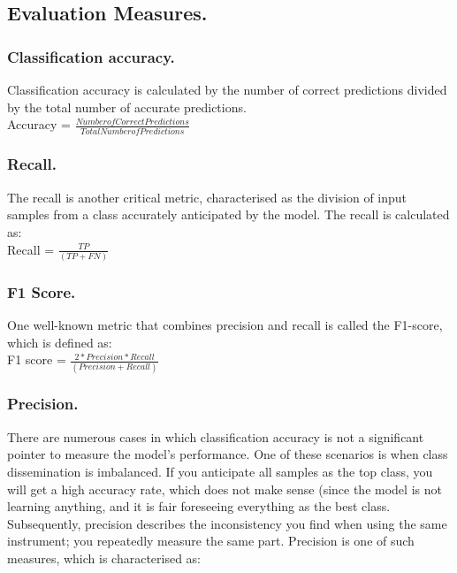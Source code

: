 \documentclass[11pt]{report}
\begin{document}
\subsection{Evaluation Measures.}
\subsubsection*{Classification accuracy.}
Classification accuracy is calculated by the number of correct predictions divided by
the total number of accurate predictions.\\

Accuracy = $\frac{Number of Correct Predictions}{Total Number of Predictions}$



\subsubsection*{Recall.}
The recall is another critical metric, characterised as the division of input samples
from a class accurately anticipated by the model. The recall is calculated as:\\

Recall = $\frac{TP}{(TP + FN)}$

\subsubsection*{F1 Score.}
One well-known metric that combines precision and recall is called the F1-score, which
is defined as:\\

F1 score = $\frac{2 * Precision * Recall}{(Precision + Recall)}$

\subsubsection*{Precision.}
There are numerous cases in which classification accuracy is not a significant pointer
to measure the model’s performance. One of these scenarios is when class dissemination
is imbalanced. If you anticipate all samples as the top class, you will get a high accuracy
rate, which does not make sense (since the model is not learning anything, and it is fair
foreseeing everything as the best class. Subsequently, precision describes the inconsistency
you find when using the same instrument; you repeatedly measure the same part. Precision
is one of such measures, which is characterised as:\\
\end{document}
